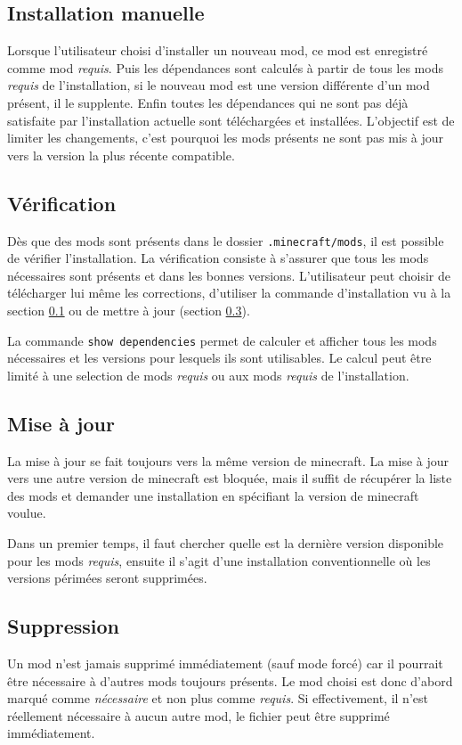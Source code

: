 \documentclass{article}
\begin{document}
\subsection{Installation manuelle}
\label{section:utilisation.manuelle}
Lorsque l'utilisateur choisi d'installer un nouveau mod, ce mod est enregistré comme mod \textit{requis}.
Puis les dépendances sont calculés à partir de tous les mods \textit{requis} de l'installation, si le nouveau mod est une version différente d'un mod présent, il le supplente.
Enfin toutes les dépendances qui ne sont pas déjà satisfaite par l'installation actuelle sont téléchargées et installées.
L'objectif est de limiter les changements, c'est pourquoi les mods présents ne sont pas mis à jour vers la version la plus récente compatible.

\subsection{Vérification}
Dès que des mods sont présents dans le dossier \texttt{.minecraft/mods}, il est possible de vérifier l'installation.
La vérification consiste à s'assurer que tous les mods nécessaires sont présents et dans les bonnes versions.
L'utilisateur peut choisir de télécharger lui même les corrections, d'utiliser la commande d'installation vu à la section \ref{section:utilisation.manuelle} ou de mettre à jour (section \ref{section:utilisation.miseajour}).

La commande \texttt{show dependencies} permet de calculer et afficher tous les mods nécessaires et les versions pour lesquels ils sont utilisables.
Le calcul peut être limité à une selection de mods \textit{requis} ou aux mods \textit{requis} de l'installation.

\subsection{Mise à jour}
\label{section:utilisation.miseajour}
La mise à jour se fait toujours vers la même version de minecraft.
La mise à jour vers une autre version de minecraft est bloquée, mais il suffit de récupérer la liste des mods et demander une installation en spécifiant la version de minecraft voulue.

Dans un premier temps, il faut chercher quelle est la dernière version disponible pour les mods \textit{requis}, ensuite il s'agit d'une installation conventionnelle où les versions périmées seront supprimées.

\subsection{Suppression}
Un mod n'est jamais supprimé immédiatement (sauf mode forcé) car il pourrait être nécessaire à d'autres mods toujours présents.
Le mod choisi est donc d'abord marqué comme \textit{nécessaire} et non plus comme \textit{requis}.
Si effectivement, il n'est réellement nécessaire à aucun autre mod, le fichier peut être supprimé immédiatement.
\end{document}
